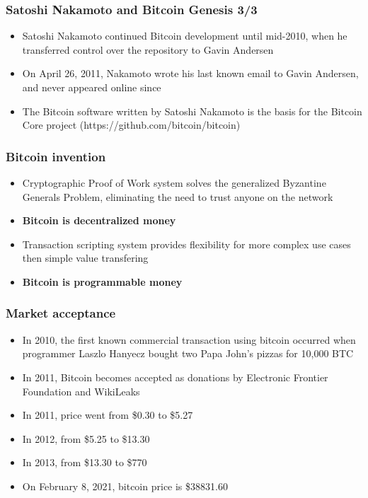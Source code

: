 \documentclass{beamer}
\begin{document}
\begin{frame}
  \frametitle{Satoshi Nakamoto and Bitcoin Genesis 3/3}
  \begin{itemize}
  \item Satoshi Nakamoto continued Bitcoin development until mid-2010, when he
    transferred control over the repository to Gavin Andersen
  \item On April 26, 2011, Nakamoto wrote his last known email to Gavin
    Andersen, and never appeared online since
  \item The Bitcoin software written by Satoshi Nakamoto is the basis for the
    Bitcoin Core project (https://github.com/bitcoin/bitcoin)
  \end{itemize}
\end{frame}

\begin{frame}
  \frametitle{Bitcoin invention}
  \begin{itemize}
  \item Cryptographic Proof of Work system solves the generalized Byzantine
    Generals Problem, eliminating the need to trust anyone on the network
  \item \textbf{Bitcoin is decentralized money}
  \item Transaction scripting system provides flexibility for more complex use
    cases then simple value transfering
  \item \textbf{Bitcoin is programmable money}
  \end{itemize}
\end{frame}

\begin{frame}
  \frametitle{Market acceptance}
  \begin{itemize}
  \item In 2010, the first known commercial transaction using bitcoin occurred
    when programmer Laszlo Hanyecz bought two Papa John's pizzas for 10,000 BTC
  \item In 2011, Bitcoin becomes accepted as donations by Electronic Frontier
    Foundation and WikiLeaks
  \item In 2011, price went from \$0.30 to \$5.27
  \item In 2012, from \$5.25 to \$13.30
  \item In 2013, from \$13.30 to \$770
  \item On February 8, 2021, bitcoin price is \$38831.60
  \end{itemize}
\end{frame}
\end{document}
